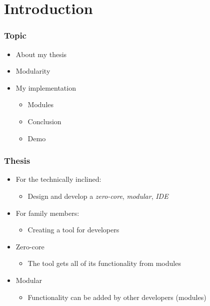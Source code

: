 \section{Introduction}
\SectionPage

\begin{frame}
  \frametitle{Topic}
  \begin{itemize}
    \item About my thesis
    \item Modularity
    \item My implementation
    \begin{itemize}
      \item Modules
      \item Conclusion
      \item Demo
    \end{itemize}
  \end{itemize}
\end{frame}

\begin{frame}
  \frametitle{Thesis}
  \begin{itemize}
    \item For the technically inclined:
      \begin{itemize}
        \item Design and develop a \textit{zero-core}, \textit{modular}, \textit{IDE} 
      \end{itemize}
    \item For family members:
      \begin{itemize}
        \item Creating a tool for developers
      \end{itemize}
    \item Zero-core
      \begin{itemize}
        \item The tool gets all of its functionality from modules
      \end{itemize}
    \item Modular
      \begin{itemize}
        \item Functionality can be added by other developers (modules)
      \end{itemize}
  \end{itemize}
\end{frame}

